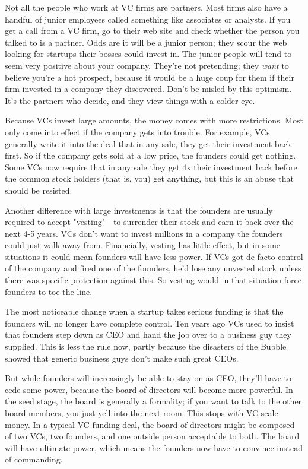 Not all the people who work at VC firms are partners.  Most firms
also have a handful of junior employees called something like
associates or analysts.  If you get a call from a VC
firm, go to their web site and check whether the person you talked
to is a partner.  Odds are it will be a junior person; they scour
the web looking for startups their bosses could invest in.  The
junior people will tend to seem very positive about your company.
They're not pretending; they \emph{want} to believe you're a hot
prospect, because it would be a huge coup for them if their firm
invested in a company they discovered.  Don't be misled by this
optimism.  It's the partners who decide, and they view things with
a colder eye.

Because VCs invest large amounts, the money comes with more
restrictions.  Most only come into effect if the company gets into
trouble.  For example, VCs generally write it into the deal that
in any sale, they get their investment back first.  So if the company
gets sold at a low price, the founders could get nothing.  Some VCs
now require that in any sale they get 4x their investment back
before the common stock holders (that is, you) get anything, but
this is an abuse that should be resisted.

Another difference with large investments is that the founders are
usually required to accept "vesting"---to surrender their stock and
earn it back over the next 4-5 years.  VCs don't want to invest
millions in a company the founders could just walk away from.
Financially, vesting has little effect, but in some situations it
could mean founders will have less power.  If VCs got de facto
control of the company and fired one of the founders, he'd lose any
unvested stock unless there was specific protection against this.
So vesting would in that situation force founders to toe the line.

The most noticeable change when a startup takes serious funding is
that the founders will no longer have complete control.  Ten years
ago VCs used to insist that founders step down as CEO and hand the
job over to a business guy they supplied.  This is less the rule
now, partly because the disasters of the Bubble showed that generic
business guys don't make such great CEOs.

But while founders will increasingly be able to stay on as CEO,
they'll have to cede some power, because the board of directors
will become more powerful.  In the seed stage, the board is generally
a formality; if you want to talk to the other board members, you
just yell into the next room.  This stops with VC-scale money.  In
a typical VC funding deal, the board of directors might be composed
of two VCs, two founders, and one outside person acceptable to both.
The board will have ultimate power, which means the founders now
have to convince instead of commanding.

